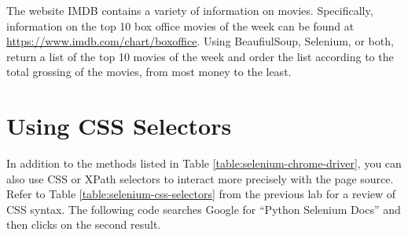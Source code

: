 \begin{comment} %
To illustrate that using Selenium solves the problem of asynchronously-loaded content, use it to load the soccer statistics page from the previous example.
\begin{lstlisting}
>>> browser = webdriver.Chrome()
>>> soccer_url = "http://www.simplesoccerstats.com/stats/teamstats.php?lge=14&type=goals&season=0"
>>> browser.get(soccer_url)
>>> soccer_soup = BeautifulSoup(browser.page_source)
>>> browser.quit() # Closes the web browser.
>>> print(soccer_soup.find(string='Chicago').parent)
<<<td>Chicago</td>>>
\end{lstlisting}
Notice that there is now a tag containing \li{"Chicago"}.
\end{comment}


\begin{problem} %

The website IMDB contains a variety of information on movies.
Specifically, information on the top 10 box office movies of the week can be found at \url{https://www.imdb.com/chart/boxoffice}.
Using BeaufiulSoup, Selenium, or both, return a list of the top 10 movies of the week and order the list according to the total grossing of the movies, from most money to the least.
\end{problem}


\section*{Using CSS Selectors}%

In addition to the methods listed in Table \ref{table:selenium-chrome-driver}, you can also use CSS or XPath selectors to interact more precisely with the page source.
Refer to Table \ref{table:selenium-css-selectors} from the previous lab for a review of CSS syntax.
The following code searches Google for ``Python Selenium Docs'' and then clicks on the second result.

